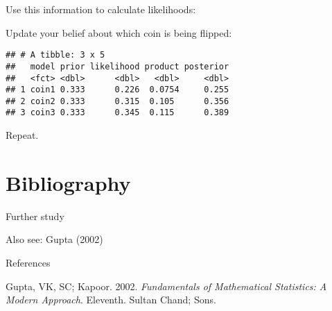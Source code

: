 \documentclass[ignorenonframetext,aspectratio=169]{beamer}
\begin{document}
\begin{frame}[fragile]{}
\protect\hypertarget{section-6}{}

Use this information to calculate likelihoods:

Update your belief about which coin is being flipped:

\begin{verbatim}
## # A tibble: 3 x 5
##   model prior likelihood product posterior
##   <fct> <dbl>      <dbl>   <dbl>     <dbl>
## 1 coin1 0.333      0.226  0.0754     0.255
## 2 coin2 0.333      0.315  0.105      0.356
## 3 coin3 0.333      0.345  0.115      0.389
\end{verbatim}

Repeat.

\end{frame}

\hypertarget{bibliography}{%
\section{Bibliography}\label{bibliography}}

\begin{frame}{Further study}
\protect\hypertarget{further-study}{}

Also see: Gupta (2002)

\end{frame}

\begin{frame}{References}
\protect\hypertarget{references}{}

\hypertarget{refs}{}
\leavevmode\hypertarget{ref-gupta2002fundamentals}{}%
Gupta, VK, SC; Kapoor. 2002. \emph{Fundamentals of Mathematical
Statistics: A Modern Approach}. Eleventh. Sultan Chand; Sons.

\end{frame}
\end{document}
